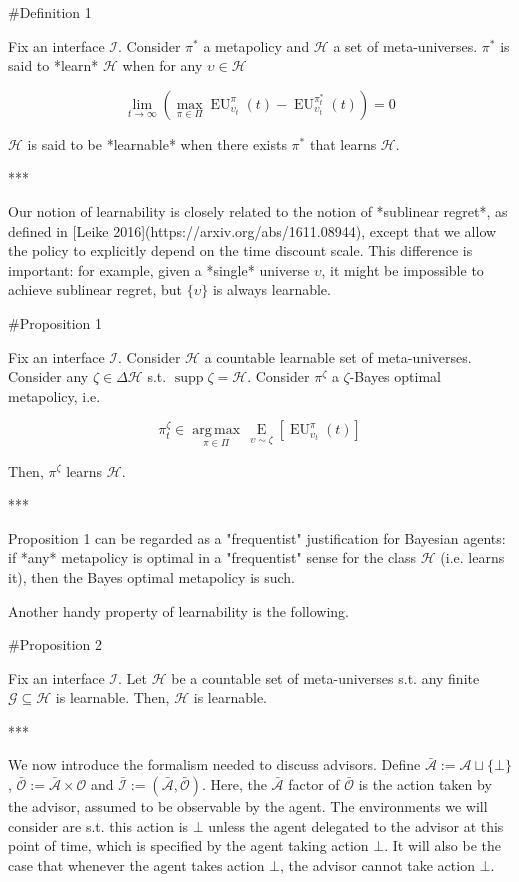 \documentclass[a4paper]{article}
\DeclareMathOperator{\Supp}{supp}
\newcommand{\E}[1]{\underset{#1}{\operatorname{E}}}
\newcommand{\Argmax}[1]{\underset{#1}{\operatorname{arg\,max}}\,}
\newcommand{\Ob}{\mathcal{O}}
\newcommand{\A}{\mathcal{A}}
\newcommand{\I}{\mathcal{I}}
\newcommand{\Ado}{\bar{\Ob}}
\newcommand{\Ada}{\bar{\A}}
\newcommand{\Adi}{\bar{\I}}
\newcommand{\Hy}{\mathcal{H}}
\newcommand{\EU}{\operatorname{EU}}
\begin{document}
\#Definition 1

Fix an interface $\I$. Consider $\pi^*$ a metapolicy and $\Hy$ a set of meta-universes. $\pi^*$ is said to *learn* $\Hy$ when for any $\upsilon \in \Hy$

$$\lim_{t \rightarrow \infty} (\max_{\pi \in \Pi} \EU_{\upsilon_t}^{\pi}(t) - \EU_{\upsilon_t}^{\pi^*_t}(t)) = 0$$

$\Hy$ is said to be *learnable* when there exists $\pi^*$ that learns $\Hy$.

***

Our notion of learnability is closely related to the notion of *sublinear regret*, as defined in [Leike 2016](https://arxiv.org/abs/1611.08944), except that we allow the policy to explicitly depend on the time discount scale. This difference is important: for example, given a *single* universe $\upsilon$, it might be impossible to achieve sublinear regret, but $\{\upsilon\}$ is always learnable.

\#Proposition 1

Fix an interface $\I$. Consider $\Hy$ a countable learnable set of meta-universes. Consider any $\zeta \in \Delta\Hy$ s.t. $\Supp \zeta = \Hy$. Consider $\pi^\zeta$ a $\zeta$-Bayes optimal metapolicy, i.e.

$$\pi^\zeta_t \in \Argmax{\pi \in \Pi} \E{\upsilon \sim \zeta}[\EU_{\upsilon_t}^{\pi}(t)]$$

Then, $\pi^\zeta$ learns $\Hy$.

***

Proposition 1 can be regarded as a "frequentist" justification for Bayesian agents: if *any* metapolicy is optimal in a "frequentist" sense for the class $\Hy$ (i.e. learns it), then the Bayes optimal metapolicy is such.

Another handy property of learnability is the following.

\#Proposition 2

Fix an interface $\I$. Let $\Hy$ be a countable set of meta-universes s.t. any finite $\mathcal{G} \subseteq \Hy$ is learnable. Then, $\Hy$ is learnable.

***

We now introduce the formalism needed to discuss advisors. Define $\Ada:=\A \sqcup \{\bot\}$, $\Ado:=\Ada \times \Ob$ and $\Adi:=(\Ada,\Ado)$. Here, the $\Ada$ factor of $\Ado$ is the action taken by the advisor, assumed to be observable by the agent. The environments we will consider are s.t. this action is $\bot$ unless the agent delegated to the advisor at this point of time, which is specified by the agent taking action $\bot$. It will also be the case that whenever the agent takes action $\bot$, the advisor cannot take action $\bot$.
\end{document}
